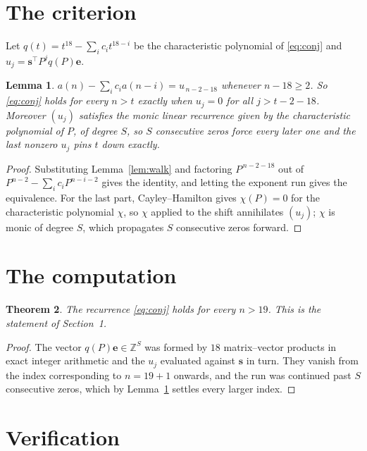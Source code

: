 \documentclass[11pt,a4paper]{article}
\theoremstyle{plain}
\newtheorem{theorem}{Theorem}
\newtheorem{lemma}[theorem]{Lemma}
\theoremstyle{definition}
\begin{document}
\section{The criterion}

Let $q(t)=t^{18}-\sum_i c_i t^{18-i}$ be the characteristic polynomial of
\eqref{eq:conj} and $u_j=\mathbf{s}^{\!\top}P^{j}q(P)\mathbf{e}$.

\begin{lemma}\label{lem:crit}
$a(n)-\sum_i c_i a(n-i)=u_{\,n-2-18}$ whenever $n-18\ge2$. So \eqref{eq:conj}
holds for every $n>t$ exactly when $u_j=0$ for all $j>t-2-18$. Moreover $(u_j)$
satisfies the monic linear recurrence given by the characteristic polynomial of $P$, of
degree $S$, so $S$ consecutive zeros force every later one and the last nonzero $u_j$ pins
$t$ down exactly.
\end{lemma}

\begin{proof}
Substituting Lemma~\ref{lem:walk} and factoring $P^{\,n-2-18}$ out of
$P^{n-2}-\sum_i c_i P^{n-i-2}$ gives the identity, and letting the exponent run gives the
equivalence. For the last part, Cayley--Hamilton gives $\chi(P)=0$ for the characteristic
polynomial $\chi$, so $\chi$ applied to the shift annihilates $(u_j)$; $\chi$ is monic of
degree $S$, which propagates $S$ consecutive zeros forward.
\end{proof}

\section{The computation}

\begin{theorem}
The recurrence \eqref{eq:conj} holds for every $n>19$. This is the statement of
Section~1.
\end{theorem}

\begin{proof}
The vector $q(P)\mathbf{e}\in\mathbb{Z}^{S}$ was formed by $18$ matrix--vector
products in exact integer arithmetic and the $u_j$ evaluated against $\mathbf{s}$ in turn.
They vanish from the index corresponding to $n=19+1$ onwards, and the run was continued
past $S$ consecutive zeros, which by Lemma~\ref{lem:crit} settles every larger index.
\end{proof}

\section{Verification}
\end{document}
